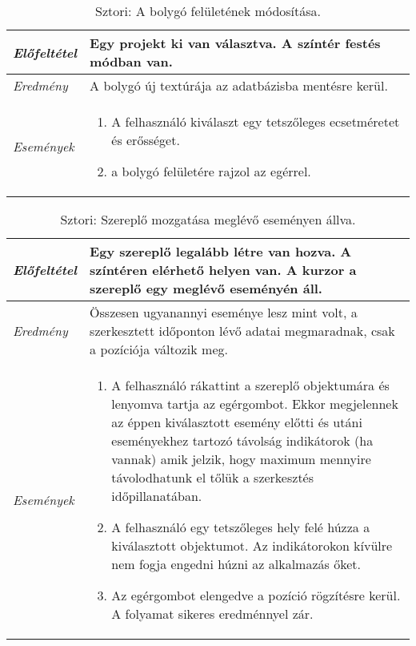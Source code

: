 \begin{table}[H]
	\centering
	\begin{tabular}{ | m{} | m{} | }
		\hline
		\emph{Előfeltétel} & Egy projekt ki van választva. A színtér festés módban van. \\
		\hline
		\emph{Eredmény} & A bolygó új textúrája az adatbázisba mentésre kerül. \\
		\hline
		\hline
		\emph{Események} &

		\begin{enumerate}[itemsep=-1ex]
			\item A felhasználó kiválaszt egy tetszőleges ecsetméretet és erősséget.
			\item a bolygó felületére rajzol az egérrel.
		\end{enumerate}
		\\
		\hline
	\end{tabular}
	\caption{Sztori: A bolygó felületének módosítása.}
	\label{tab:story-terraforming}
\end{table}

\begin{table}[H]
	\centering
	\begin{tabular}{ | m{} | m{} | }
		\hline
		\emph{Előfeltétel} & Egy szereplő legalább létre van hozva. A színtéren elérhető helyen van. A kurzor a szereplő egy meglévő eseményén áll. \\
		\hline
		\emph{Eredmény} & Összesen ugyanannyi eseménye lesz mint volt, a szerkesztett időponton lévő adatai megmaradnak, csak a pozíciója változik meg. \\
		\hline
		\hline
		\emph{Események} &

		\begin{enumerate}[itemsep=-1ex]
			\item A felhasználó rákattint a szereplő objektumára és lenyomva tartja az egérgombot. Ekkor megjelennek az éppen kiválasztott esemény előtti és utáni eseményekhez tartozó távolság indikátorok (ha vannak) amik jelzik, hogy maximum mennyire távolodhatunk el tőlük a szerkesztés időpillanatában.
			\item A felhasználó egy tetszőleges hely felé húzza a kiválasztott objektumot. Az indikátorokon kívülre nem fogja engedni húzni az alkalmazás őket.
			\item Az egérgombot elengedve a pozíció rögzítésre kerül. A folyamat sikeres eredménnyel zár.
		\end{enumerate}
		\\
		\hline
	\end{tabular}
	\caption{Sztori: Szereplő mozgatása meglévő eseményen állva.}
	\label{tab:story-actor-move-on-event}
\end{table}


